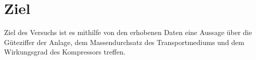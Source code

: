 \section{Ziel}
\label{sec:Ziel}
\setlength{\parindent}{0pt}
Ziel des Versuchs ist es mithilfe von den erhobenen Daten eine Aussage über die Güteziffer 
der Anlage, dem Massendurchsatz des Transportmediums und dem Wirkungsgrad des Kompressors treffen.